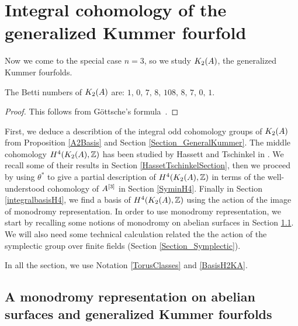 
\section{Integral cohomology of the generalized Kummer fourfold}
Now we come to the special case $n=3$, so we study $\kum{A}{2}$, the generalized Kummer fourfolds.
\begin{proposition}
The Betti numbers of $\kum{A}{2}$ are:
$
1,\,0,\,7,\,8,\,108,\,8,\,7,\,0,\,1.
$
\end{proposition}
\begin{proof}
This follows from G\"ottsche's formula~\cite[page 49]{Gottsche}.
\end{proof}

First, we deduce a describtion of the integral odd cohomology groups of $\X$ from Proposition \ref{A2Basis} and Section \ref{Section_GeneralKummer}.
The middle cohomology $H^4(\X,\Z)$ has been studied by Hassett and Tschinkel in \cite{Hassett}. We recall some of their results in Section \ref{HassetTschinkelSection},
then we proceed by using $\theta^*$ to give a partial description of $H^4(\X,\Z)$ in terms of the well-understood cohomology of $A\hilb{3}$ in Section \ref{SyminH4}. 
Finally in Section \ref{integralbasisH4}, we find a basis of $H^4(\X,\Z)$ using the action of the image of monodromy representation.
In order to use monodromy representation, we start by recalling some notions of monodromy on abelian surfaces in Section \ref{monodromyexplication}. 
We will also need some technical calculation related the the action of the symplectic group over finite fields (Section \ref{Section_Symplectic}).

In all the section, we use Notation \ref{TorusClasses} and \ref{BasisH2KA}.

\subsection{A monodromy representation on abelian surfaces and generalized Kummer fourfolds}\label{monodromyexplication}


